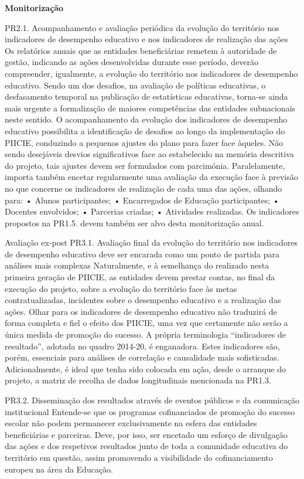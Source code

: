 \documentclass[
]{book}
\begin{document}
\textbf{Monitorização}

PR2.1. Acompanhamento e avaliação periódica da evolução do território nos indicadores de desempenho educativo e nos indicadores de realização das ações
Os relatórios anuais que as entidades beneficiárias remetem à autoridade de gestão, indicando as ações desenvolvidas durante esse período, deverão compreender, igualmente, a evolução do território nos indicadores de desempenho educativo. Sendo um dos desafios, na avaliação de políticas educativas, o desfasamento temporal na publicação de estatísticas educativas, torna-se ainda mais urgente a formalização de maiores competências das entidades subnacionais neste sentido.
O acompanhamento da evolução dos indicadores de desempenho educativo possibilita a identificação de desafios ao longo da implementação do PIICIE, conduzindo a pequenos ajustes do plano para fazer face àqueles. Não sendo desejáveis desvios significativos face ao estabelecido na memória descritiva do projeto, tais ajustes devem ser formulados com parcimónia.
Paralelamente, importa também encetar regularmente uma avaliação da execução face à previsão no que concerne os indicadores de realização de cada uma das ações, olhando para:
• Alunos participantes;
• Encarregados de Educação participantes;
• Docentes envolvidos;
• Parcerias criadas;
• Atividades realizadas.
Os indicadores propostos na PR1.5. devem também ser alvo desta monitorização anual.

Avaliação ex-post
PR3.1. Avaliação final da evolução do território nos indicadores de desempenho educativo deve ser encarada como um ponto de partida para análises mais complexas
Naturalmente, e à semelhança do realizado nesta primeira geração de PIICIE, as entidades devem prestar contas, no final da execução do projeto, sobre a evolução do território face às metas contratualizadas, incidentes sobre o desempenho educativo e a realização das ações.
Olhar para os indicadores de desempenho educativo não traduzirá de forma completa e fiel o efeito dos PIICIE, uma vez que certamente não serão a única medida de promoção do sucesso. A própria terminologia ``indicadores de resultado'', adotada no quadro 2014-20, é enganadora. Estes indicadores são, porém, essenciais para análises de correlação e causalidade mais sofisticadas.
Adicionalmente, é ideal que tenha sido colocada em ação, desde o arranque do projeto, a matriz de recolha de dados longitudinais mencionada na PR1.3.

PR3.2. Disseminação dos resultados através de eventos públicos e da comunicação institucional
Entende-se que os programas cofinanciados de promoção do sucesso escolar não podem permanecer exclusivamente na esfera das entidades beneficiárias e parceiras. Deve, por isso, ser encetado um esforço de divulgação das ações e dos respetivos resultados junto de toda a comunidade educativa do território em questão, assim promovendo a visibilidade do cofinanciamento europeu na área da Educação.
\end{document}
